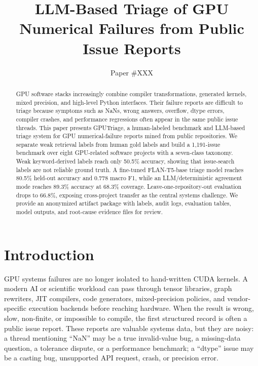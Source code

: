 \documentclass[sigplan,10pt]{acmart}
\newcommand{\system}{GPUTriage}
\begin{document}
\sloppy

\title{LLM-Based Triage of GPU Numerical Failures from Public Issue Reports}

\author{Paper \#XXX}

\begin{abstract}
GPU software stacks increasingly combine compiler transformations, generated
kernels, mixed precision, and high-level Python interfaces. Their failure
reports are difficult to triage because symptoms such as NaNs, wrong answers,
overflow, dtype errors, compiler crashes, and performance regressions often
appear in the same public issue threads. This paper presents \system{}, a
human-labeled benchmark and LLM-based triage system for GPU numerical-failure
reports mined from public repositories. We separate weak retrieval labels from
human gold labels and build a 1,191-issue benchmark over eight GPU-related
software projects with a seven-class taxonomy. Weak keyword-derived labels
reach only 50.5\% accuracy, showing that issue-search labels are not reliable
ground truth. A fine-tuned FLAN-T5-base triage model reaches 80.5\% held-out
accuracy and 0.778 macro F1, while an LLM/deterministic agreement mode reaches
89.3\% accuracy at 68.3\% coverage. Leave-one-repository-out evaluation drops
to 66.8\%, exposing cross-project transfer as the central systems challenge.
We provide an anonymized artifact package with labels, audit logs, evaluation
tables, model outputs, and root-cause evidence files for review.
\end{abstract}

\maketitle

\section{Introduction}

GPU systems failures are no longer isolated to hand-written CUDA kernels. A
modern AI or scientific workload can pass through tensor libraries, graph
rewriters, JIT compilers, code generators, mixed-precision policies, and
vendor-specific execution backends before reaching hardware. When the result is
wrong, slow, non-finite, or impossible to compile, the first structured record
is often a public issue report. These reports are valuable systems data, but
they are noisy: a thread mentioning ``NaN'' may be a true invalid-value bug, a
missing-data question, a tolerance dispute, or a performance benchmark; a
``dtype'' issue may be a casting bug, unsupported API request, crash, or
precision error.
\end{document}
